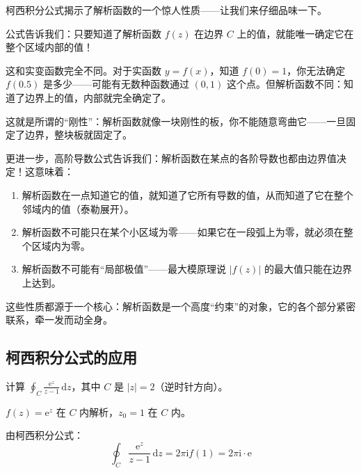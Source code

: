 \begin{tishi}
柯西积分公式揭示了解析函数的一个惊人性质——让我们来仔细品味一下。

公式告诉我们：只要知道了解析函数 $f(z)$ 在边界 $C$ 上的值，就能唯一确定它在整个区域内部的值！

这和实变函数完全不同。对于实函数 $y = f(x)$，知道 $f(0) = 1$，你无法确定 $f(0.5)$ 是多少——可能有无数种函数通过 $(0, 1)$ 这个点。但解析函数不同：知道了边界上的值，内部就完全确定了。

这就是所谓的``刚性''：解析函数就像一块刚性的板，你不能随意弯曲它——一旦固定了边界，整块板就固定了。

更进一步，高阶导数公式告诉我们：解析函数在某点的各阶导数也都由边界值决定！这意味着：
\begin{enumerate}
    \item 解析函数在一点知道它的值，就知道了它所有导数的值，从而知道了它在整个邻域内的值（泰勒展开）。
    \item 解析函数不可能只在某个小区域为零——如果它在一段弧上为零，就必须在整个区域内为零。
    \item 解析函数不可能有``局部极值''——最大模原理说 $|f(z)|$ 的最大值只能在边界上达到。
\end{enumerate}

这些性质都源于一个核心：解析函数是一个高度``约束''的对象，它的各个部分紧密联系，牵一发而动全身。
\end{tishi}

\subsection{柯西积分公式的应用}

\begin{lizi}{}{}
计算 $\displaystyle\oint_C \frac{\mathrm{e}^z}{z - 1}\,\mathrm{d}z$，其中 $C$ 是 $|z| = 2$（逆时针方向）。

\begin{jie}
    $f(z) = \mathrm{e}^z$ 在 $C$ 内解析，$z_0 = 1$ 在 $C$ 内。
    
    由柯西积分公式：
    \begin{equation}
        \oint_C \frac{\mathrm{e}^z}{z - 1}\,\mathrm{d}z = 2\pi\mathrm{i} f(1) = 2\pi\mathrm{i} \cdot \mathrm{e}
    \end{equation}
\end{jie}
\end{lizi}

